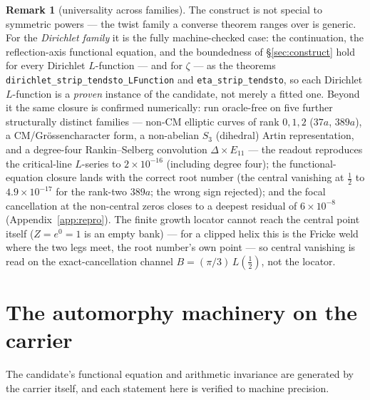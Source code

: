 \documentclass[11pt]{article}
\theoremstyle{definition}
\newtheorem{remark}[theorem]{Remark}
\begin{document}
\begin{remark}[universality across families]
The construct is not special to symmetric powers --- the twist family a converse theorem ranges over
is generic. For the \emph{Dirichlet family} it is the fully machine-checked case: the continuation, the
reflection-axis functional equation, and the boundedness of \S\ref{sec:construct} hold for every
Dirichlet $L$-function --- and for $\zeta$ --- as the theorems \\
\texttt{dirichlet\_strip\_tendsto\_LFunction} and \texttt{eta\_strip\_tendsto}, so each Dirichlet
$L$-function is a \emph{proven} instance of the candidate, not merely a fitted one. Beyond it the same
closure is confirmed numerically: run oracle-free on five further structurally distinct families ---
non-CM elliptic curves of rank $0,1,2$ ($37a$, $389a$), a CM/Gr\"ossencharacter form, a non-abelian
$S_3$ (dihedral) Artin representation, and a degree-four Rankin--Selberg convolution
$\Delta\times E_{11}$ --- the readout reproduces the critical-line $L$-series to $2\times10^{-16}$
(including degree four); the functional-equation closure lands with the correct root number (the
central vanishing at $\tfrac12$ to $4.9\times10^{-17}$ for the rank-two $389a$; the wrong sign rejected);
and the focal cancellation at the non-central zeros closes to a deepest residual of
$6\times10^{-8}$ (Appendix~\ref{app:repro}). The finite growth
locator cannot reach the central point itself ($Z=e^{0}=1$ is an empty bank) --- for a clipped helix
this is the Fricke weld where the two legs meet, the root number's own point --- so central vanishing
is read on the exact-cancellation channel $B=(\pi/3)\,L(\tfrac12)$, not the locator.
\end{remark}

\section{The automorphy machinery on the carrier}\label{sec:machinery}

The candidate's functional equation and arithmetic invariance are generated by the carrier itself, and
each statement here is verified to machine precision.
\end{document}
